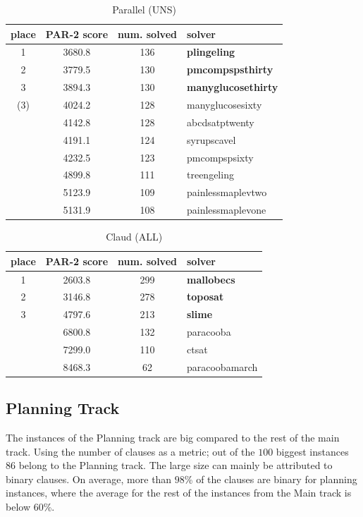 \documentclass{elsarticle}
\begin{document}
\begin{table}
\caption{Parallel (UNS)}
\label{tab:parallelUNS}
\begin{tabular}{cccl}
place & PAR-2 score & num. solved & solver \\
\hline
 1 & 3680.8 & 136 & {\bf plingeling} \\
 2 & 3779.5 & 130 & {\bf pmcompspsthirty} \\
 3 & 3894.3 & 130 & {\bf manyglucosethirty} \\
(3)& 4024.2 & 128 & manyglucosesixty \\
   & 4142.8 & 128 & abcdsatptwenty \\
   & 4191.1 & 124 & syrupscavel \\
   & 4232.5 & 123 & pmcompspsixty \\
   & 4899.8 & 111 & treengeling \\
   & 5123.9 & 109 & painlessmaplevtwo \\
   & 5131.9 & 108 & painlessmaplevone \\
\end{tabular}
\end{table}


\begin{table}
\caption{Claud (ALL)}
\label{tab:claud}
\begin{tabular}{cccl}
place & PAR-2 score & num. solved & solver \\
\hline
 1 & 2603.8 & 299 & {\bf mallobecs} \\
 2 & 3146.8 & 278 & {\bf toposat} \\
 3 & 4797.6 & 213 & {\bf slime} \\
   & 6800.8 & 132 & paracooba \\
   & 7299.0 & 110 & ctsat \\
   & 8468.3 & \phantom{0}62 & paracoobamarch \\
\end{tabular}
\end{table}


\subsection{Planning Track}
The instances of the Planning track are big compared to the rest of the
main track. Using the number of clauses as a metric; out of the $100$ biggest
instances
$86$ belong to the Planning track. The large size can mainly be attributed to
binary clauses. On average, more than $98$\% of the clauses are binary for
planning instances, where the average for the rest of the instances from the
Main track is below $60$\%.
\end{document}
